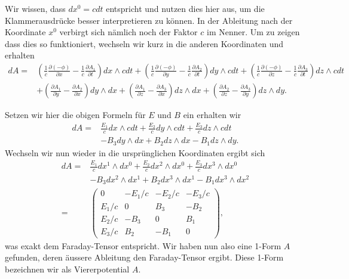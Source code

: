 Wir wissen, dass $dx^0 = cdt$ entspricht und nutzen dies hier aus, um die Klammerausdrücke besser interpretieren zu können.
In der Ableitung nach der Koordinate $x^0$ verbirgt sich nämlich noch der Faktor $c$ im Nenner.
Um zu zeigen dass dies so funktioniert, wechseln wir kurz in die anderen Koordinaten und erhalten
\begin{align*}
	dA = 
	& \left(\frac{1}{c}\frac{\partial (-\phi)}{\partial x}-\frac{1}{c}\frac{\partial A_1}{\partial t}\right) dx \wedge cdt +
	\left(\frac{1}{c}\frac{\partial (-\phi)}{\partial y}-\frac{1}{c}\frac{\partial A_2}{\partial t}\right) dy \wedge cdt +
	\left(\frac{1}{c}\frac{\partial (-\phi)}{\partial z}-\frac{1}{c}\frac{\partial A_3}{\partial t}\right) dz \wedge cdt\\
	& + \left(\frac{\partial A_1}{\partial y}-\frac{\partial A_2}{\partial x}\right) dy \wedge dx +
	\left(\frac{\partial A_1}{\partial z}-\frac{\partial A_3}{\partial x}\right) dz \wedge dx +
	\left(\frac{\partial A_2}{\partial z}-\frac{\partial A_3}{\partial y}\right) dz \wedge dy.
\end{align*}
\begin{comment}
Diesen Teil oben rausgenommen da hier die c verschwinden (vermutlich irrelevant:)
& = \left(\frac{\partial (-\phi)}{\partial x}-\frac{\partial A_1}{\partial t}\right) dx \wedge dt +
\left(\frac{\partial (-\phi)}{\partial y}-\frac{\partial A_2}{\partial t}\right) dy \wedge dt +
\left(\frac{\partial (-\phi)}{\partial z}-\frac{\partial A_3}{\partial t}\right) dz \wedge dt\\
& + \left(\frac{\partial A_1}{\partial y}-\frac{\partial A_2}{\partial x}\right) dy \wedge dx +
\left(\frac{\partial A_1}{\partial z}-\frac{\partial A_3}{\partial x}\right) dz \wedge dx +
\left(\frac{\partial A_2}{\partial z}-\frac{\partial A_3}{\partial y}\right) dz \wedge dy.\\
\end{comment}
Setzen wir hier die obigen Formeln für $E$ und $B$ ein erhalten wir
\begin{align*}
	dA = 
	& \frac{E_1}{c} dx \wedge cdt +
	\frac{E_2}{c} dy \wedge cdt +
	\frac{E_3}{c} dz \wedge cdt\\
	& - B_3 dy \wedge dx +
	B_2 dz \wedge dx -
	B_1 dz \wedge dy.
\end{align*}
Wechseln wir nun wieder in die ursprünglichen Koordinaten ergibt sich
\begin{align*}
	dA =&  \frac{E_1}{c} dx^1 \wedge dx^0 +
	\frac{E_2}{c} dx^2 \wedge dx^0 +
	\frac{E_3}{c} dx^3 \wedge dx^0\\
	& - B_3 dx^2 \wedge dx^1 +
	B_2 dx^3 \wedge dx^1 -
	B_1 dx^3 \wedge dx^2\\[2ex] = 
	& \begin{pmatrix}
		0 & -E_1/c & -E_2/c & -E_3/c \\ E_1/c & 0 & B_3 & -B_2 \\ E_2/c & -B_3 & 0 & B_1 \\ E_3/c & B_2 & -B_1 & 0 
	\end{pmatrix},
\end{align*}
was exakt dem Faraday-Tensor entspricht.
Wir haben nun also eine 1-Form $A$ gefunden, deren äussere Ableitung den Faraday-Tensor ergibt.
Diese 1-Form bezeichnen wir als Viererpotential $A$.